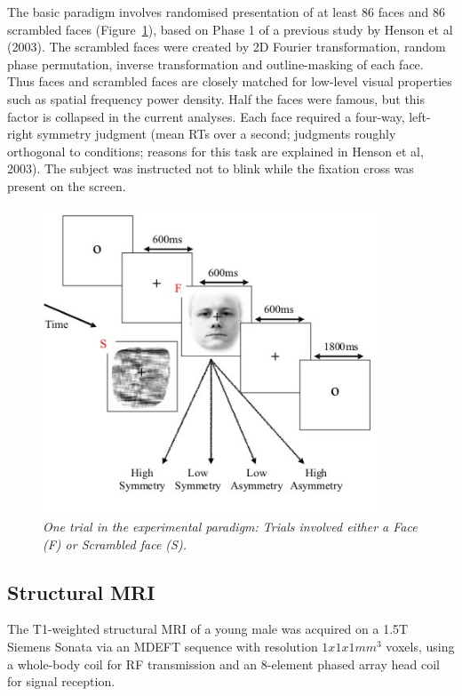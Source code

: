 The basic paradigm involves randomised presentation of at least 86 faces and 86 scrambled faces (Figure~\ref{fig_32_1}), based on Phase 1 of a previous study by Henson et al (2003). The scrambled faces were created by 2D Fourier transformation, random phase permutation, inverse transformation and outline-masking of each face. Thus faces and scrambled faces are closely matched for low-level visual properties such as spatial frequency power density. Half the faces were famous, but this factor is collapsed in the current analyses. Each face required a four-way, left-right symmetry judgment (mean RTs over a second; judgments roughly orthogonal to conditions; reasons for this task are explained in Henson et al, 2003). The subject was instructed not to blink while the fixation cross was present on the screen.


\begin{figure}
\begin{center}
\includegraphics[width=100mm]{multimodal/figures/figure_32_1}
\caption{\em One trial in the experimental paradigm: Trials involved either a Face (F) or Scrambled face (S). \label{fig_32_1}}
\end{center}
\end{figure}

\subsection{Structural MRI}

The T1-weighted structural MRI of a young male was acquired on a 1.5T Siemens Sonata via an MDEFT sequence with resolution $1 x 1 x 1 mm^3$ voxels, using a whole-body coil for RF transmission and an 8-element phased array head coil for signal reception.

